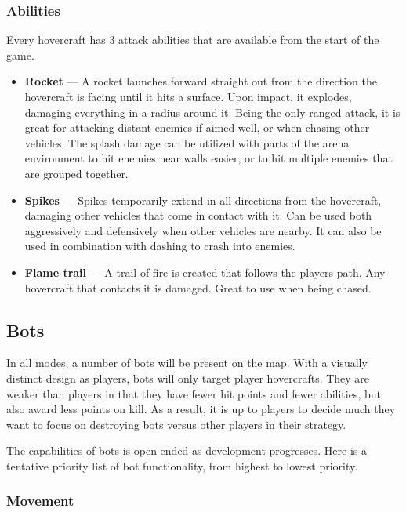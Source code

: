 \documentclass{article}
\theoremstyle{definition}
\begin{document}
\subsubsection{Abilities}

Every hovercraft has 3 attack abilities that are available from the start of
the game.

\begin{itemize}
  \item \textbf{Rocket} --- A rocket launches forward straight out from the
    direction the hovercraft is facing until it hits a surface. Upon impact, it
    explodes, damaging everything in a radius around it. Being the only ranged
    attack, it is great for attacking distant enemies if aimed well, or when
    chasing other vehicles. The splash damage can be utilized with parts of the
    arena environment to hit enemies near walls easier, or to hit multiple
    enemies that are grouped together.
  \item \textbf{Spikes} --- Spikes temporarily extend in all directions from
    the hovercraft, damaging other vehicles that come in contact with it. Can
    be used both aggressively and defensively when other vehicles are nearby.
    It can also be used in combination with dashing to crash into enemies.
  \item \textbf{Flame trail} --- A trail of fire is created that follows the
    players path. Any hovercraft that contacts it is damaged. Great to use when
    being chased.
\end{itemize}

\subsection{Bots}

In all modes, a number of bots will be present on the map. With a visually
distinct design as players, bots will only target player hovercrafts. They are
weaker than players in that they have fewer hit points and fewer abilities, but
also award less points on kill. As a result, it is up to players to decide much
they want to focus on destroying bots versus other players in their strategy.

The capabilities of bots is open-ended as development progresses. Here is
a tentative priority list of bot functionality, from highest to lowest
priority.

\subsubsection{Movement}
\end{document}
